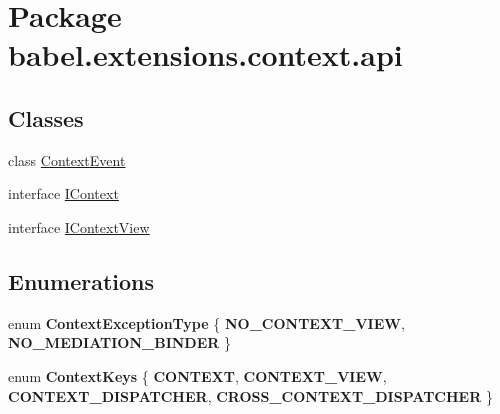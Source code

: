 \hypertarget{namespacebabel_1_1extensions_1_1context_1_1api}{\section{Package babel.\-extensions.\-context.\-api}
\label{namespacebabel_1_1extensions_1_1context_1_1api}
}
\subsection*{Classes}
\begin{DoxyCompactItemize}
\item 
class \hyperlink{classbabel_1_1extensions_1_1context_1_1api_1_1_context_event}{Context\-Event}
\item 
interface \hyperlink{interfacebabel_1_1extensions_1_1context_1_1api_1_1_i_context}{I\-Context}
\item 
interface \hyperlink{interfacebabel_1_1extensions_1_1context_1_1api_1_1_i_context_view}{I\-Context\-View}
\end{DoxyCompactItemize}
\subsection*{Enumerations}
\begin{DoxyCompactItemize}
\item 
enum {\bfseries Context\-Exception\-Type} \{ {\bfseries N\-O\-\_\-\-C\-O\-N\-T\-E\-X\-T\-\_\-\-V\-I\-E\-W}, 
{\bfseries N\-O\-\_\-\-M\-E\-D\-I\-A\-T\-I\-O\-N\-\_\-\-B\-I\-N\-D\-E\-R}
 \}
\item 
enum {\bfseries Context\-Keys} \{ {\bfseries C\-O\-N\-T\-E\-X\-T}, 
{\bfseries C\-O\-N\-T\-E\-X\-T\-\_\-\-V\-I\-E\-W}, 
{\bfseries C\-O\-N\-T\-E\-X\-T\-\_\-\-D\-I\-S\-P\-A\-T\-C\-H\-E\-R}, 
{\bfseries C\-R\-O\-S\-S\-\_\-\-C\-O\-N\-T\-E\-X\-T\-\_\-\-D\-I\-S\-P\-A\-T\-C\-H\-E\-R}
 \}
\end{DoxyCompactItemize}
